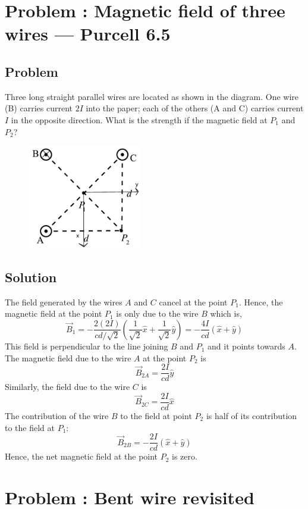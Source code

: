 \documentclass[solutions]{esg8022pset}
\begin{document}
\section{Problem \thesection: Magnetic field of three wires --- Purcell 6.5}
\subsection{Problem}
  Three long straight parallel wires are located as shown in the diagram. One
  wire (B) carries current $2 I$ into the paper; each of the others (A and C)
  carries current $I$ in the opposite direction. What is the strength if the
  magnetic field at $P_1$ and $P_{2}$?
  \begin{figure}[H]
    \centering
    \includegraphics[width = 5cm]{Threewires}
  \end{figure}
\subsection{Solution}
  The field generated by the wires $A$ and $C$ cancel at the point $P_{1}$.
  Hence, the magnetic field at the point $P_{1}$ is only due
  to the wire $B$ which is,
  $$\vec{B}_{1} = -\frac{2 (2I)}{ c d/\sqrt{2}} \left( \frac{1}{\sqrt{2} } \hat{x}+\frac{1}{\sqrt{2} } \hat{y} \right) = -\frac{4I}{cd} ( \hat{x} +  \hat{y})$$
  This field is perpendicular to the line joining $B$ and $P_{1}$ and it points
  towards $A$.\\
  \noindent  The magnetic field due to the wire $A$ at  the point $P_{2}$ is
  $$\vec{B}_{2A} =\frac {2 I}{cd}  \hat{y}$$
  Similarly, the field due to the wire $C$ is
  $$\vec{B}_{2C} = \frac{2 I}{cd}  \hat{x}$$
  The contribution of the wire $B$ to the field at point $P_{2}$ is half of its contribution to the field at $P_{1}$:
  $$\vec{B}_{2B} =  -\frac{2I}{cd} ( \hat{x} +  \hat{y})$$
  Hence, the net magnetic field at the point $P_{2}$ is zero.
\section{Problem \thesection: Bent wire revisited}
\end{document}
